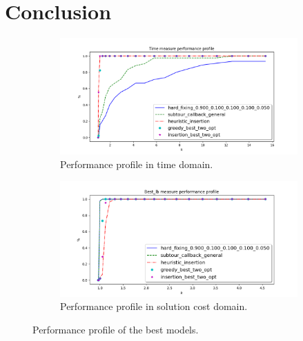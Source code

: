 \chapter{Conclusion}

\begin{figure}[!h]
	\centering
	\begin{subfigure}{.9\textwidth}
		\centering
		\includegraphics[width=\columnwidth]{../res/Lbest_time.png}
		\caption{Performance profile in time domain.}
		\label{fig:Lbest_time}
	\end{subfigure}
	\begin{subfigure}{.9\textwidth}
		\centering
		\includegraphics[width=\columnwidth]{../res/Lbest_lb.png}
		\caption{Performance profile in solution cost domain.}
		\label{fig:Lbest_lb}
	\end{subfigure}
	\caption{Performance profile of the best models.}
	\label{fig:pp_Lbest}
\end{figure}